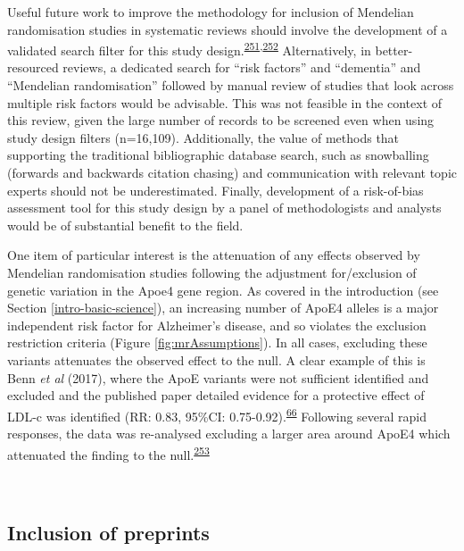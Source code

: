 \documentclass[a4paper, twoside]{templates/ociamthesis}
\begin{document}
Useful future work to improve the methodology for inclusion of Mendelian randomisation studies in systematic reviews should involve the development of a validated search filter for this study design.\textsuperscript{\protect\hyperlink{ref-waffenschmidt2020}{251},\protect\hyperlink{ref-wagner2020}{252}} Alternatively, in better-resourced reviews, a dedicated search for ``risk factors'' and ``dementia'' and ``Mendelian randomisation'' followed by manual review of studies that look across multiple risk factors would be advisable. This was not feasible in the context of this review, given the large number of records to be screened even when using study design filters (n=16,109). Additionally, the value of methods that supporting the traditional bibliographic database search, such as snowballing (forwards and backwards citation chasing) and communication with relevant topic experts should not be underestimated. Finally, development of a risk-of-bias assessment tool for this study design by a panel of methodologists and analysts would be of substantial benefit to the field.

One item of particular interest is the attenuation of any effects observed by Mendelian randomisation studies following the adjustment for/exclusion of genetic variation in the Apoe4 gene region. As covered in the introduction (see Section \ref{intro-basic-science}), an increasing number of ApoE4 alleles is a major independent risk factor for Alzheimer's disease, and so violates the exclusion restriction criteria (Figure \ref{fig:mrAssumptions}). In all cases, excluding these variants attenuates the observed effect to the null. A clear example of this is Benn \emph{et al} (2017), where the ApoE variants were not sufficient identified and excluded and the published paper detailed evidence for a protective effect of LDL-c was identified (RR: 0.83, 95\%CI: 0.75-0.92).\textsuperscript{\protect\hyperlink{ref-benn2017}{66}} Following several rapid responses, the data was re-analysed excluding a larger area around ApoE4 which attenuated the finding to the null.\textsuperscript{\protect\hyperlink{ref-benn2017a}{253}}

~

\hypertarget{inclusion-of-preprints}{%
\subsection{Inclusion of preprints}\label{inclusion-of-preprints}}
\end{document}
